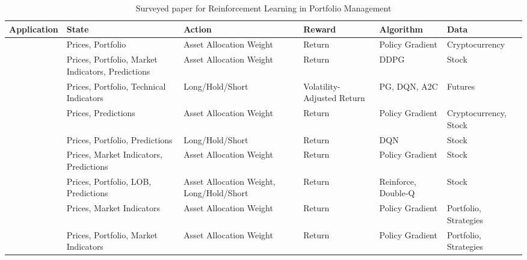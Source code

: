 \begin{table}[H]
\caption{Surveyed paper for Reinforcement Learning in Portfolio Management}
\label{table:multi_stage_portfolio_management}
\begin{tabular}{| m{2cm} | m{3cm}| m{2.5cm} | m{2.5cm} |m{1.7cm} |m{2.3cm} | }
\hline
Application & State& Action & Reward & Algorithm& Data \\ \hline
\cite{jiang2017deep} & Prices, Portfolio& Asset Allocation Weight & Return& Policy Gradient& Cryptocurrency \\ \hline
\cite{yu2019model}& Prices, Portfolio, Market Indicators, Predictions & Asset Allocation Weight & Return& DDPG& Stock \\ \hline
\cite{zhang2020deep} & Prices, Portfolio, Technical Indicators& Long/Hold/Short & Volatility-Adjusted Return & PG, DQN, A2C & Futures \\ \hline
\cite{ye2020reinforcement} & Prices, Predictions & Asset Allocation Weight & Return& Policy Gradient& Cryptocurrency, Stock \\ \hline
\cite{nan2020sentiment} & Prices, Portfolio, Predictions & Long/Hold/Short & Return& DQN & Stock \\ \hline
\cite{wang2021deeptrader} & Prices, Market Indicators, Predictions & Asset Allocation Weight & Return& Policy Gradient& Stock \\ \hline
\cite{wang2021commission} & Prices, Portfolio, LOB, Predictions & Asset Allocation Weight, Long/Hold/Short & Return& Reinforce, Double-Q & Stock \\ \hline
\cite{benhamou2020aamdrl} & Prices, Market Indicators & Asset Allocation Weight & Return& Policy Gradient& Portfolio, Strategies \\ \hline
\cite{benhamou2021detecting} & Prices, Portfolio, Market Indicators & Asset Allocation Weight & Return& Policy Gradient& Portfolio, Strategies \\ \hline
\end{tabular}
\end{table}



